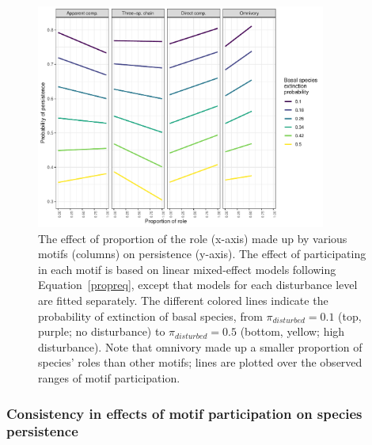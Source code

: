 \documentclass[12pt]{article}
\begin{document}
\begin{spacing}{2.0}
            
            \begin{figure}[h!]
                \centering
                \includegraphics[width=0.85\textwidth]{figures/prop_lmer_allCS.pdf}
                \caption{The effect of proportion of the role (x-axis) made up by various motifs (columns) on persistence (y-axis). The effect of participating in each motif is based on linear mixed-effect models following Equation~\ref{propreq}, except that models for each  disturbance level are fitted separately. The different colored lines indicate the probability of extinction of basal species, from $\pi_{disturbed} = 0.1$ (top, purple; no disturbance) to $\pi_{disturbed} = 0.5$ (bottom, yellow; high disturbance). Note that omnivory made up a smaller proportion of species' roles than other motifs; lines are plotted over the observed ranges of motif participation.}
                \label{fig:prop_lmer_all}
            \end{figure}
        
        \clearpage
    
        \subsubsection*{Consistency in effects of motif participation on species persistence}

            

\end{spacing}
\end{document}
